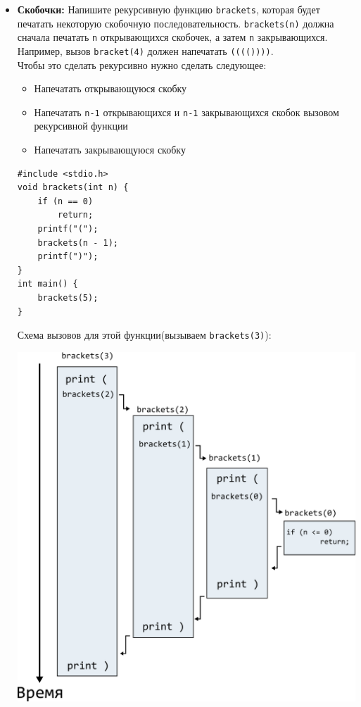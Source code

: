 \documentclass{article}
\begin{document}
\begin{itemize}
\item \textbf{Скобочки:} Напишите рекурсивную функцию \texttt{brackets}, которая будет печатать некоторую скобочную последовательность. \texttt{brackets(n)} должна сначала печатать \texttt{n} открывающихся скобочек, а затем \texttt{n} закрывающихся. Например, вызов \texttt{bracket(4)} должен напечатать \texttt{(((())))}. \\
Чтобы это сделать рекурсивно нужно сделать следующее:
\begin{itemize}
\item Напечатать открывающуюся скобку
\item Напечатать \texttt{n-1} открывающихся и \texttt{n-1} закрывающихся скобок вызовом рекурсивной функции
\item Напечатать закрывающуюся скобку
\end{itemize}
\begin{lstlisting}[backgroundcolor = \color{solcolor}]
#include <stdio.h>
void brackets(int n) {
    if (n == 0)
        return;
    printf("(");
    brackets(n - 1);
    printf(")");
}
int main() {
    brackets(5);
}
\end{lstlisting}
\newpage
Схема вызовов для этой функции(вызываем \texttt{brackets(3)}):
\begin{center}
\includegraphics[scale=0.72]{../images/brackets.png}
\end{center}


\end{itemize}
\end{document}

